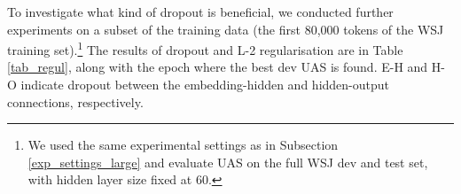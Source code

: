 To investigate what kind of dropout is beneficial,  we conducted further experiments on a subset of the training data (the first 80,000 tokens of the WSJ training set).\footnote{We used the same experimental settings as in Subsection \ref{exp_settings_large} and evaluate UAS on the full WSJ dev and test set, with hidden layer size fixed at 60.}
The results of dropout and L-2 regularisation are in Table \ref{tab_regul}, along with the epoch where the best dev UAS is found. E-H and H-O indicate dropout between the embedding-hidden and hidden-output connections, respectively. %

